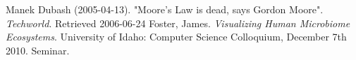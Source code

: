 



\begin{thebibliography}{99}
 Manek Dubash (2005-04-13). "Moore's Law is dead, says 
	Gordon Moore". {\em Techworld}. Retrieved 2006-06-24
 Foster, James. {\em Visualizing Human Microbiome
        Ecosystems}. University of Idaho: Computer Science Colloquium, 
        December 7th 2010. Seminar.	


\end{thebibliography}
